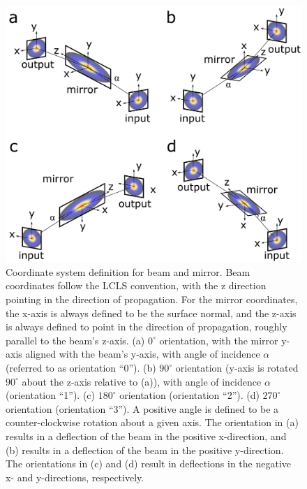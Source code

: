 \documentclass[11pt,fleqn]{article} %
\begin{document}
\begin{figure}[htb]
\begin{center}
\includegraphics[width=1.0\textwidth]{Figures/coordinates.pdf}
\caption{Coordinate system definition for beam and mirror. Beam coordinates follow the LCLS convention, with the z direction pointing in the direction of propagation. For the mirror coordinates, the x-axis is always defined to be the surface normal, and the z-axis is always defined to point in the direction of propagation,  roughly parallel to the beam's z-axis. (a) $0^\circ$ orientation, with the mirror y-axis aligned with the beam's y-axis, with angle of incidence $\alpha$ (referred to as orientation ``0''). (b) $90^\circ$ orientation (y-axis is rotated $90^\circ$ about the z-axis relative to (a)), with angle of incidence $\alpha$ (orientation ``1''). (c) $180^\circ$ orientation (orientation ``2''). (d) $270^\circ$ orientation (orientation ``3''). A positive angle is defined to be a counter-clockwise rotation about a given axis. The orientation in (a) results in a deflection of the beam in the positive x-direction, and (b) results in a deflection of the beam in the positive y-direction. The orientations in (c) and (d) result in deflections in the negative x- and y-directions, respectively.}
\label{fig:coordinates}
\end{center}
\end{figure}
\end{document}
